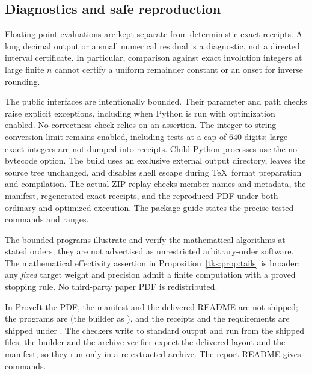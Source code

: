 \subsection{Diagnostics and safe reproduction}
Floating-point evaluations are kept separate from deterministic exact receipts. A long decimal output or a small numerical residual is a diagnostic, not a directed interval certificate. In particular, comparison against exact involution integers at large finite $n$ cannot certify a uniform remainder constant or an onset for inverse rounding.

The public interfaces are intentionally bounded. Their parameter and path checks raise explicit exceptions, including when Python is run with optimization enabled. No correctness check relies on an assertion. The integer-to-string conversion limit remains enabled, including tests at a cap of $640$ digits; large exact integers are not dumped into receipts. Child Python processes use the no-bytecode option. The build uses an exclusive external output directory, leaves the source tree unchanged, and disables shell escape during \TeX\ format preparation and compilation. The actual ZIP replay checks member names and metadata, the manifest, regenerated exact receipts, and the reproduced PDF under both ordinary and optimized execution. The package guide states the precise tested commands and ranges.

The bounded programs illustrate and verify the mathematical algorithms at stated orders; they are not advertised as unrestricted arbitrary-order software. The mathematical effectivity assertion in Proposition~\ref{tks:prop:tails} is broader: any \emph{fixed} target weight and precision admit a finite computation with a proved stopping rule. No third-party paper PDF is redistributed.
\begin{writenote}
In ProveIt the PDF, the manifest and the delivered README are not shipped; the
programs are  (the builder as ), and the
receipts  and the requirements are shipped under
. The checkers write to standard output and run from the shipped
files; the builder and the archive verifier expect the delivered layout and
the manifest, so they run only in a re-extracted archive. The report README
gives commands.
\end{writenote}

